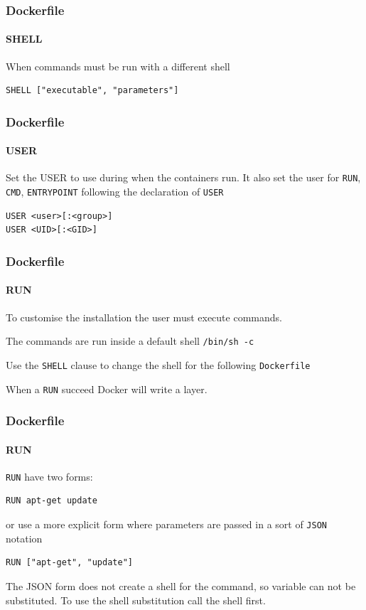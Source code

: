 \begin{frame}[fragile]
\frametitle{Dockerfile}
\framesubtitle{SHELL}

When commands must be run with a different shell

\begin{lstlisting}
SHELL ["executable", "parameters"]
\end{lstlisting}
\end{frame}

\begin{frame}[fragile]
\frametitle{Dockerfile}
\framesubtitle{USER}

Set the USER to use during when the containers run.
It also set the user for \lstinline!RUN!, \lstinline!CMD!, \lstinline!ENTRYPOINT! following the declaration of \lstinline!USER!

\begin{lstlisting}
USER <user>[:<group>]
USER <UID>[:<GID>]
\end{lstlisting}
\end{frame}

\begin{frame}[fragile]
\frametitle{Dockerfile}
\framesubtitle{RUN}

To customise the installation the user must execute commands.

The commands are run inside a default shell \lstinline!/bin/sh -c!

Use the \lstinline!SHELL! clause to change the shell for the following \lstinline!Dockerfile!

When a \lstinline!RUN! succeed Docker will write a layer.
\end{frame}

\begin{frame}[fragile]
\frametitle{Dockerfile}
\framesubtitle{RUN}

\lstinline!RUN! have two forms:

\begin{lstlisting}
RUN apt-get update
\end{lstlisting}

or use a more explicit form where parameters are passed in a sort of \lstinline!JSON! notation

\begin{lstlisting}
RUN ["apt-get", "update"]
\end{lstlisting}

The JSON form does not create a shell for the command, so variable can not be substituted. To use the shell substitution call the shell first.
\end{frame}

